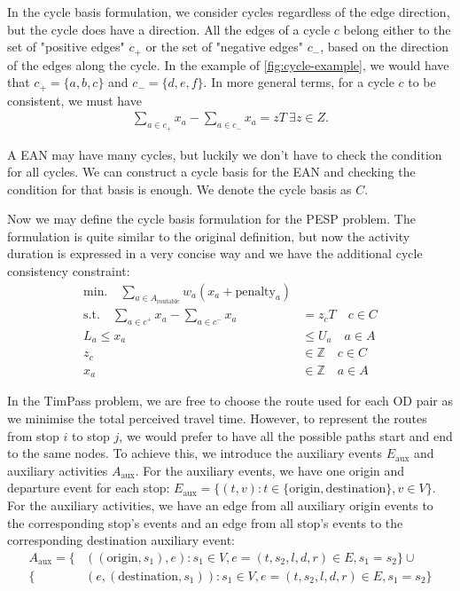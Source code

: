 \documentclass[english, 12pt, a4paper, sci, utf8, a-2b, online]{aaltothesis}
\newcommand{\Z}{\mathbb{Z}}
\begin{document}
In the cycle basis formulation, we consider cycles regardless of the edge direction, but the cycle does have a direction. All the edges of a cycle $c$ belong either to the set of "positive edges" $c_+$ or the set of "negative edges" $c_-$, based on the direction of the edges along the cycle. In the example of \cref{fig:cycle-example}, we would have that $c_+ = \{a, b, c\}$ and $c_- = \{d, e, f\}$. In more general terms, for a cycle $c$ to be consistent, we must have
\begin{align}
    \sum_{a\in c_+}x_a - \sum_{a \in c_-}x_a = zT\ \exists z \in Z.
\end{align}

A EAN may have many cycles, but luckily we don't have to check the condition for all cycles. We can construct a cycle basis for the EAN and checking the condition for that basis is enough. We denote the cycle basis as $C$.  %


Now we may define the cycle basis formulation for the PESP problem. The formulation is quite similar to the original definition, but now the activity duration is expressed in a very concise way and we have the additional cycle consistency constraint:
\begin{align}
    \textrm{min.} \quad  \sum_{a \in A_\text{routable}} w_{a} (x_a + \textrm{penalty}_a) \\
    \textrm{s.t.} \quad  \sum_{a\in c^+} x_a - \sum_{a\in c^-} x_a & = z_c T \quad c \in C \\
    L_a \leq x_a & \leq U_a \quad a \in A \\
    z_c &\in \Z \quad c \in C \\
    x_a &\in \Z \quad a \in A
\end{align}

In the TimPass problem, we are free to choose the route used for each OD pair as we minimise the total perceived travel time. However, to represent the routes from stop $i$ to stop $j$, we would prefer to have all the possible paths start and end to the same nodes. To achieve this, we introduce the auxiliary events $E_\text{aux}$ and auxiliary activities $A_\text{aux}$. For the auxiliary events, we have one origin and departure event for each stop: $E_\text{aux} = \{(t, v) : t \in \{\text{origin}, \text{destination}\}, v \in V\}$. For the auxiliary activities, we have an edge from all auxiliary origin events to the corresponding stop's events and an edge from all stop's events to the corresponding destination auxiliary event:
\begin{align}
    A_\text{aux} = \{&((\text{origin}, s_1), e): s_1 \in V, e = (t, s_2, l, d, r) \in E, s_1 = s_2\} \cup \\
    \{&(e, (\text{destination}, s_1)): s_1 \in V, e = (t, s_2, l, d, r) \in E, s_1 = s_2\}
\end{align}
\end{document}
